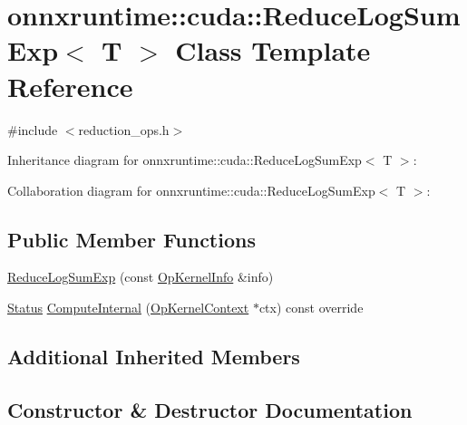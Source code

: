 \hypertarget{classonnxruntime_1_1cuda_1_1ReduceLogSumExp}{}\section{onnxruntime\+:\+:cuda\+:\+:Reduce\+Log\+Sum\+Exp$<$ T $>$ Class Template Reference}
\label{classonnxruntime_1_1cuda_1_1ReduceLogSumExp}


{\ttfamily \#include $<$reduction\+\_\+ops.\+h$>$}



Inheritance diagram for onnxruntime\+:\+:cuda\+:\+:Reduce\+Log\+Sum\+Exp$<$ T $>$\+:


Collaboration diagram for onnxruntime\+:\+:cuda\+:\+:Reduce\+Log\+Sum\+Exp$<$ T $>$\+:
\subsection*{Public Member Functions}
\begin{DoxyCompactItemize}
\item 
\mbox{\hyperlink{classonnxruntime_1_1cuda_1_1ReduceLogSumExp_a3aadbcd732fd576abbcbb19865c077cf}{Reduce\+Log\+Sum\+Exp}} (const \mbox{\hyperlink{classonnxruntime_1_1OpKernelInfo}{Op\+Kernel\+Info}} \&info)
\item 
\mbox{\hyperlink{classonnxruntime_1_1common_1_1Status}{Status}} \mbox{\hyperlink{classonnxruntime_1_1cuda_1_1ReduceLogSumExp_a409c23ca08af097ab4af96a222548735}{Compute\+Internal}} (\mbox{\hyperlink{classonnxruntime_1_1OpKernelContext}{Op\+Kernel\+Context}} $\ast$ctx) const override
\end{DoxyCompactItemize}
\subsection*{Additional Inherited Members}


\subsection{Constructor \& Destructor Documentation}
\mbox{\label{classonnxruntime_1_1cuda_1_1ReduceLogSumExp_a3aadbcd732fd576abbcbb19865c077cf}} 
